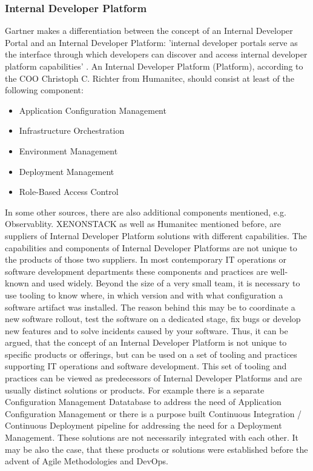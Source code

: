 \documentclass[a4paper,12pt]{article}
\begin{document}
    \subsubsection{Internal Developer Platform}
    Gartner makes a differentiation between the concept of an Internal Developer Portal and an Internal Developer Platform:
    'internal developer portals serve as the interface through which developers can discover and
    access internal developer platform capabilities' \cite{gartner}.
    An Internal Developer Platform (Platform), according to the COO Christoph C. Richter from Humanitec\cite{richteretal},
    should consist at least of the following component:
    \begin{itemize}
        \item Application Configuration Management
        \item Infrastructure Orchestration
        \item Environment Management
        \item Deployment Management
        \item Role-Based Access Control
    \end{itemize}
    In some other sources, there are also additional components mentioned, e.g. Observablity\cite{xenon}.
    XENONSTACK as well as Humanitec mentioned before, are suppliers of Internal Developer Platform solutions with different capabilities.
    The capabilities and components of Internal Developer Platforms are not unique to the products of those two suppliers.
    In most contemporary IT operations or software development departments these components and practices are well-known
    and used widely.
    Beyond the size of a very small team, it is necessary to use tooling to know where, in which version and with what
    configuration a software artifact was installed.
    The reason behind this may be to coordinate a new software rollout, test the software on a dedicated stage, fix bugs
    or develop new features and to solve incidents caused by your software.
    Thus, it can be argued, that the concept of an Internal Developer Platform is not unique to specific products
    or offerings, but can be used on a set of tooling and practices supporting IT operations and software development.
    This set of tooling and practices can be viewed as predecessors of Internal Developer Platforms and are usually
    distinct solutions or products.
    For example there is a separate Configuration Management Datatabase
    to address the need of Application Configuration Management or there is a purpose built Continuous Integration /
    Continuous Deployment pipeline for addressing the need for a Deployment Management.
    These solutions are not necessarily integrated with each other.
    It may be also the case, that these
    products or solutions were established before the advent of Agile Methodologies and DevOps.
\end{document}
